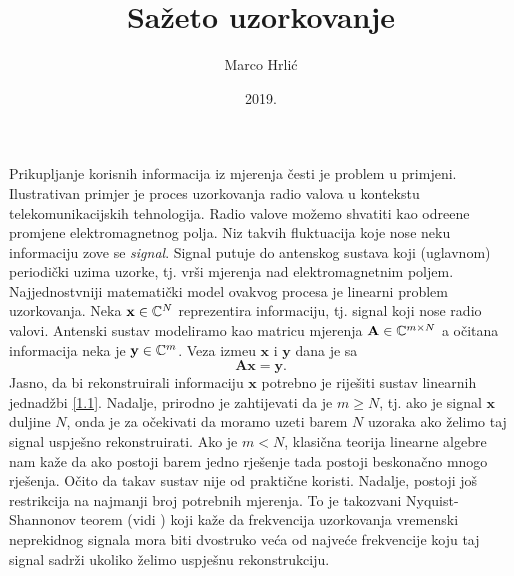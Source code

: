 \documentclass[a4paper,twoside,12pt]{memoir} %
\title{Sa\v{z}eto uzorkovanje}
\author{Marco Hrli\'c}
\date{2019.}  %
\newcommand{\vect}[1]{\mathbf{#1}}
\renewcommand{\vec}{\vect}
\begin{document}
\setlength\abovedisplayskip{10pt}
\setlength\belowdisplayskip{10pt}
\setlength\abovedisplayshortskip{10pt}
\setlength\belowdisplayshortskip{10pt}

\nocite{*}

\frontmatter


\begin{intro}
    Prikupljanje korisnih informacija iz mjerenja \v{c}esti je problem u primjeni. Ilustrativan primjer je proces uzorkovanja radio valova u kontekstu telekomunikacijskih tehnologija. Radio valove mo\v{z}emo shvatiti kao odre\dj ene promjene elektromagnetnog polja. Niz takvih fluktuacija koje nose neku informaciju zove se \textit{signal}. Signal putuje do antenskog sustava koji (uglavnom) periodi\v{c}ki uzima uzorke, tj. vr\v{s}i mjerenja nad elektromagnetnim poljem. Najjednostvniji matemati\v{c}ki model ovakvog procesa je linearni problem uzorkovanja. Neka $\vec x \in \C^N$ reprezentira informaciju, tj. signal koji nose radio valovi. Antenski sustav modeliramo kao matricu mjerenja $\vec A \in \C^{m \times N}$ a o\v{c}itana informacija neka je $\vec y \in \C^m$. Veza izme\dj u $\vec x$ i $\vec y$ dana je sa
    \begin{equation}\label{1.1}
        \vec{Ax} = \vec{y}. 
    \end{equation}
    Jasno, da bi rekonstruirali informaciju $\vec x$ potrebno je rije\v{s}iti sustav linearnih jednad\v{z}bi \eqref{1.1}. Nadalje, prirodno je zahtijevati da je $m \geq N$, tj. ako je signal $\vec x$ duljine $N$, onda je za o\v{c}ekivati da moramo uzeti barem $N$ uzoraka ako \v{z}elimo taj signal uspje\v{s}no rekonstruirati. Ako je $m < N$, klasi\v{c}na teorija linearne algebre nam ka\v{z}e da ako postoji barem jedno rje\v{s}enje tada postoji beskona\v{c}no mnogo rje\v{s}enja. O\v{c}ito da takav sustav nije od prakti\v{c}ne koristi. Nadalje, postoji jo\v{s} restrikcija na najmanji broj potrebnih mjerenja. To je takozvani Nyquist-Shannonov teorem (vidi \cite{shannon1949}) koji ka\v{z}e da frekvencija uzorkovanja vremenski neprekidnog signala mora biti dvostruko ve\'ca od najve\'ce frekvencije koju taj signal sadr\v{z}i ukoliko \v{z}elimo uspje\v{s}nu rekonstrukciju. \\
    \indent

\end{intro}
\end{document}
